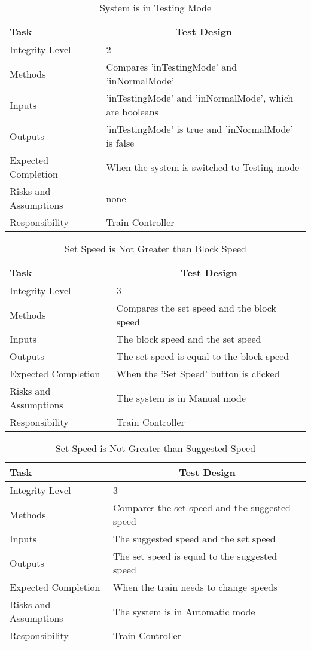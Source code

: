 \documentclass[]{article}
\begin{document}
\begin{table}[H]
	\centering
	\caption{System is in Testing Mode}
	\begin{tabular}{|l|l|}
		\hline
		Task & \multicolumn{1}{c|}{Test Design} \\ \hline
		Integrity Level & 2 \\ \hline
		Methods & Compares 'inTestingMode' and 'inNormalMode'\\ \hline
		Inputs & 'inTestingMode' and 'inNormalMode', which are booleans\\ \hline
		Outputs & 'inTestingMode' is true and 'inNormalMode'  is false\\ \hline
		Expected Completion & When the system is switched to Testing mode\\ \hline
		Risks and Assumptions & none\\ \hline
		Responsibility & Train Controller\\ \hline
	\end{tabular}
\end{table}

\begin{table}[H]
	\centering
	\caption{Set Speed is Not Greater than Block Speed}
	\begin{tabular}{|l|l|}
		\hline
		Task & \multicolumn{1}{c|}{Test Design} \\ \hline
		Integrity Level & 3 \\ \hline
		Methods & Compares the set speed and the block speed\\ \hline
		Inputs & The block speed and the set speed\\ \hline
		Outputs & The set speed is equal to the block speed \\ \hline
		Expected Completion & When the 'Set Speed' button is clicked\\ \hline
		Risks and Assumptions & The system is in Manual mode\\ \hline
		Responsibility & Train Controller\\ \hline
	\end{tabular}
\end{table}

\begin{table}[H]
	\centering
	\caption{Set Speed is Not Greater than Suggested Speed}
	\begin{tabular}{|l|l|}
		\hline
		Task & \multicolumn{1}{c|}{Test Design} \\ \hline
		Integrity Level & 3 \\ \hline
		Methods & Compares the set speed and the suggested speed\\ \hline
		Inputs & The suggested speed and the set speed\\ \hline
		Outputs & The set speed is equal to the suggested speed \\ \hline
		Expected Completion & When the train needs to change speeds\\ \hline
		Risks and Assumptions & The system is in Automatic mode \\ \hline
		Responsibility &  Train Controller\\ \hline
	\end{tabular}
\end{table}
\end{document}
